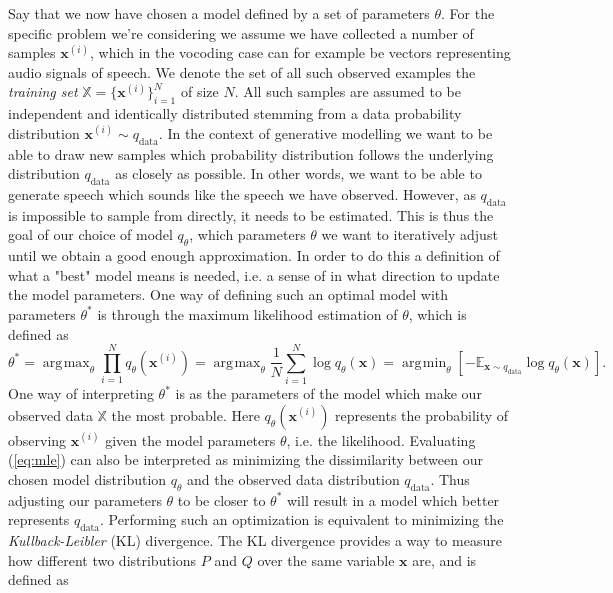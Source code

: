 \documentclass{report}
\DeclareMathOperator*{\argmax}{\arg\!\max}
\DeclareMathOperator*{\argmin}{\arg\!\min}
\begin{document}
Say that we now have chosen a model defined by a set of parameters $\theta$. For the specific problem we're considering we assume we have collected a number of samples $\bm{x}^{(i)}$, which in the vocoding case can for example be vectors representing audio signals of speech. We denote the set of all such observed examples the \textit{training set} $\mathbb{X} = \{\bm{x}^{(i)}\}_{i=1}^{N}$ of size $N$. All such samples are assumed to be independent and identically distributed stemming from a data probability distribution $\bm{x}^{(i)} \sim q_{\text{data}}$. In the context of generative modelling we want to be able to draw new samples which probability distribution follows the underlying distribution $q_{\text{data}}$ as closely as possible. In other words, we want to be able to generate speech which sounds like the speech we have observed. However, as $q_{\text{data}}$ is impossible to sample from directly, it needs to be estimated. This is thus the goal of our choice of model $q_{\theta}$, which parameters $\theta$ we want to iteratively adjust until we obtain a good enough approximation. In order to do this a definition of what a "best" model means is needed, i.e. a sense of in what direction to update the model parameters. One way of defining such an optimal model with parameters $\theta^{*}$ is through the maximum likelihood estimation of $\theta$, which is defined as
\begin{equation} \label{eq:mle}
    \theta^{*} = \argmax_{\theta} \prod_{i=1}^N q_{\theta}\left(\bm{x}^{(i)}\right) = \argmax_{\theta} \frac{1}{N} \sum_{i=1}^N \log q_{\theta}(\bm{x})= \argmin_{\theta} \left[ -\mathbb{E}_{\bm{x} \sim q_{\text{data}}} \log q_{\theta}(\bm{x}) \right].
\end{equation}
One way of interpreting $\theta^*$ is as the parameters of the model which make our observed data $\mathbb{X}$ the most probable. Here $q_{\theta}(\bm{x}^{(i)})$ represents the probability of observing $\bm{x}^{(i)}$ given the model parameters $\theta$, i.e. the likelihood. Evaluating (\ref{eq:mle}) can also be interpreted as minimizing the dissimilarity between our chosen model distribution $q_{\theta}$ and the observed data distribution $q_{\text{data}}$. Thus adjusting our parameters $\theta$ to be closer to $\theta^{*}$ will result in a model which better represents $q_{\text{data}}$. Performing such an optimization is equivalent to minimizing the \textit{Kullback-Leibler} (KL) divergence. The KL divergence provides a way to measure how different two distributions $P$ and $Q$ over the same variable $\bm{x}$ are, and is defined as
\end{document}
